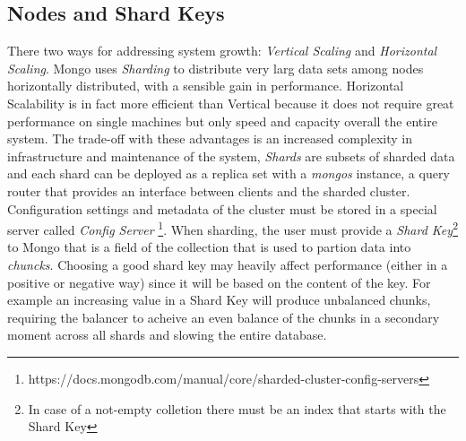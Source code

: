 \subsection{Nodes and Shard Keys}
There two ways for addressing system growth: \textit{Vertical Scaling} and \textit{Horizontal Scaling}. Mongo uses \textit{Sharding} to distribute very larg data sets among nodes horizontally distributed, with a sensible gain in performance.
Horizontal Scalability is in fact more efficient than Vertical because it does not require great performance on single machines but only speed and capacity overall the entire system. The trade-off with these advantages is an increased complexity in infrastructure and maintenance of the system,
\textit{Shards} are subsets of sharded data and each shard can be deployed as a replica set with a \textit{mongos} instance, a query router that provides an interface between clients and the sharded cluster.
Configuration settings and metadata of the cluster must be stored in a special server called \textit{Config Server} \footnote{https://docs.mongodb.com/manual/core/sharded-cluster-config-servers}.
When sharding, the user must provide a \textit{Shard Key}\footnote{In case of a not-empty colletion there must be an index that starts with the Shard Key} to Mongo that is a field of the collection that is used to partion data into \textit{chuncks}. Choosing a good shard key may heavily affect performance (either in a positive or negative way) since it will be based on the content of the key. For example an increasing value in a Shard Key will produce unbalanced chunks, requiring the balancer to acheive an even balance of the chunks in a secondary moment across all shards and slowing the entire database.

